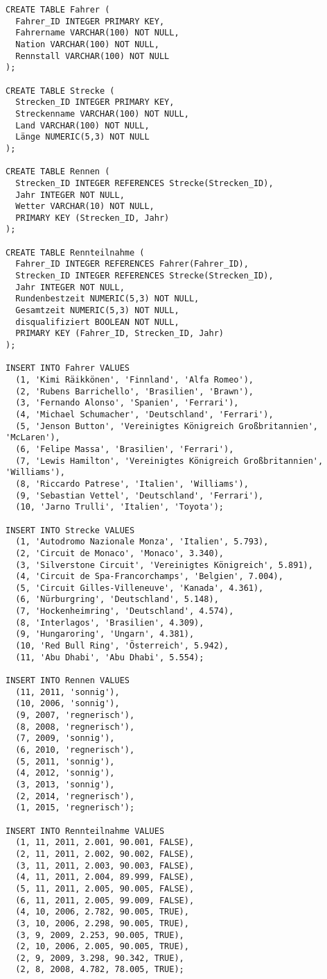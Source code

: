 \documentclass{lehramt-informatik-aufgabe}
\begin{document}
\begin{verbatim}
CREATE TABLE Fahrer (
  Fahrer_ID INTEGER PRIMARY KEY,
  Fahrername VARCHAR(100) NOT NULL,
  Nation VARCHAR(100) NOT NULL,
  Rennstall VARCHAR(100) NOT NULL
);

CREATE TABLE Strecke (
  Strecken_ID INTEGER PRIMARY KEY,
  Streckenname VARCHAR(100) NOT NULL,
  Land VARCHAR(100) NOT NULL,
  Länge NUMERIC(5,3) NOT NULL
);

CREATE TABLE Rennen (
  Strecken_ID INTEGER REFERENCES Strecke(Strecken_ID),
  Jahr INTEGER NOT NULL,
  Wetter VARCHAR(10) NOT NULL,
  PRIMARY KEY (Strecken_ID, Jahr)
);

CREATE TABLE Rennteilnahme (
  Fahrer_ID INTEGER REFERENCES Fahrer(Fahrer_ID),
  Strecken_ID INTEGER REFERENCES Strecke(Strecken_ID),
  Jahr INTEGER NOT NULL,
  Rundenbestzeit NUMERIC(5,3) NOT NULL,
  Gesamtzeit NUMERIC(5,3) NOT NULL,
  disqualifiziert BOOLEAN NOT NULL,
  PRIMARY KEY (Fahrer_ID, Strecken_ID, Jahr)
);

INSERT INTO Fahrer VALUES
  (1, 'Kimi Räikkönen', 'Finnland', 'Alfa Romeo'),
  (2, 'Rubens Barrichello', 'Brasilien', 'Brawn'),
  (3, 'Fernando Alonso', 'Spanien', 'Ferrari'),
  (4, 'Michael Schumacher', 'Deutschland', 'Ferrari'),
  (5, 'Jenson Button', 'Vereinigtes Königreich Großbritannien', 'McLaren'),
  (6, 'Felipe Massa', 'Brasilien', 'Ferrari'),
  (7, 'Lewis Hamilton', 'Vereinigtes Königreich Großbritannien', 'Williams'),
  (8, 'Riccardo Patrese', 'Italien', 'Williams'),
  (9, 'Sebastian Vettel', 'Deutschland', 'Ferrari'),
  (10, 'Jarno Trulli', 'Italien', 'Toyota');

INSERT INTO Strecke VALUES
  (1, 'Autodromo Nazionale Monza', 'Italien', 5.793),
  (2, 'Circuit de Monaco', 'Monaco', 3.340),
  (3, 'Silverstone Circuit', 'Vereinigtes Königreich', 5.891),
  (4, 'Circuit de Spa-Francorchamps', 'Belgien', 7.004),
  (5, 'Circuit Gilles-Villeneuve', 'Kanada', 4.361),
  (6, 'Nürburgring', 'Deutschland', 5.148),
  (7, 'Hockenheimring', 'Deutschland', 4.574),
  (8, 'Interlagos', 'Brasilien', 4.309),
  (9, 'Hungaroring', 'Ungarn', 4.381),
  (10, 'Red Bull Ring', 'Österreich', 5.942),
  (11, 'Abu Dhabi', 'Abu Dhabi', 5.554);

INSERT INTO Rennen VALUES
  (11, 2011, 'sonnig'),
  (10, 2006, 'sonnig'),
  (9, 2007, 'regnerisch'),
  (8, 2008, 'regnerisch'),
  (7, 2009, 'sonnig'),
  (6, 2010, 'regnerisch'),
  (5, 2011, 'sonnig'),
  (4, 2012, 'sonnig'),
  (3, 2013, 'sonnig'),
  (2, 2014, 'regnerisch'),
  (1, 2015, 'regnerisch');

INSERT INTO Rennteilnahme VALUES
  (1, 11, 2011, 2.001, 90.001, FALSE),
  (2, 11, 2011, 2.002, 90.002, FALSE),
  (3, 11, 2011, 2.003, 90.003, FALSE),
  (4, 11, 2011, 2.004, 89.999, FALSE),
  (5, 11, 2011, 2.005, 90.005, FALSE),
  (6, 11, 2011, 2.005, 99.009, FALSE),
  (4, 10, 2006, 2.782, 90.005, TRUE),
  (3, 10, 2006, 2.298, 90.005, TRUE),
  (3, 9, 2009, 2.253, 90.005, TRUE),
  (2, 10, 2006, 2.005, 90.005, TRUE),
  (2, 9, 2009, 3.298, 90.342, TRUE),
  (2, 8, 2008, 4.782, 78.005, TRUE);

\end{verbatim}
\end{document}

